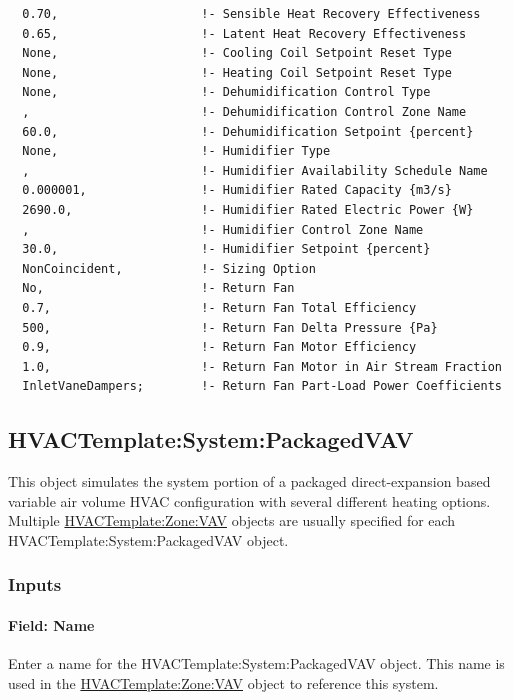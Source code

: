 \begin{lstlisting}
  0.70,                    !- Sensible Heat Recovery Effectiveness
  0.65,                    !- Latent Heat Recovery Effectiveness
  None,                    !- Cooling Coil Setpoint Reset Type
  None,                    !- Heating Coil Setpoint Reset Type
  None,                    !- Dehumidification Control Type
  ,                        !- Dehumidification Control Zone Name
  60.0,                    !- Dehumidification Setpoint {percent}
  None,                    !- Humidifier Type
  ,                        !- Humidifier Availability Schedule Name
  0.000001,                !- Humidifier Rated Capacity {m3/s}
  2690.0,                  !- Humidifier Rated Electric Power {W}
  ,                        !- Humidifier Control Zone Name
  30.0,                    !- Humidifier Setpoint {percent}
  NonCoincident,           !- Sizing Option
  No,                      !- Return Fan
  0.7,                     !- Return Fan Total Efficiency
  500,                     !- Return Fan Delta Pressure {Pa}
  0.9,                     !- Return Fan Motor Efficiency
  1.0,                     !- Return Fan Motor in Air Stream Fraction
  InletVaneDampers;        !- Return Fan Part-Load Power Coefficients
\end{lstlisting}

\subsection{HVACTemplate:System:PackagedVAV}\label{hvactemplatesystempackagedvav}

This object simulates the system portion of a packaged direct-expansion based variable air volume HVAC configuration with several different heating options. Multiple \hyperref[hvactemplatezonevav]{HVACTemplate:Zone:VAV} objects are usually specified for each HVACTemplate:System:PackagedVAV object.

\subsubsection{Inputs}\label{inputs-19-002}

\paragraph{Field: Name}\label{field-name-6-008}

Enter a name for the HVACTemplate:System:PackagedVAV object. This name is used in the \hyperref[hvactemplatezonevav]{HVACTemplate:Zone:VAV} object to reference this system.

